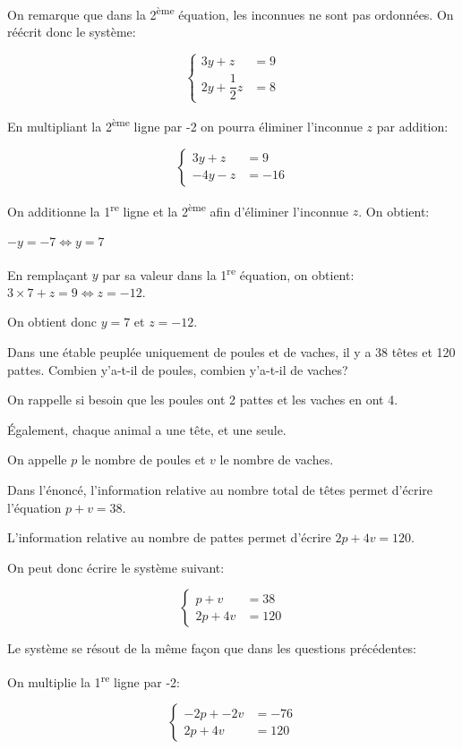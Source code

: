 \documentclass[a4paper,12pt]{scrartcl}
\begin{document}
On remarque que dans la 2\textsuperscript{ème} équation, les inconnues ne sont pas ordonnées. On réécrit donc le système:

$$
\begin{cases} 
3y+z &= 9 \\
2y + \dfrac{1}{2} z &= 8
\end{cases}
$$

En multipliant la 2\textsuperscript{ème} ligne par -2 on pourra éliminer l'inconnue $z$ par addition:
 
$$
\begin{cases} 
3y+z &= 9 \\
-4y - z &= -16
\end{cases}
$$

On additionne la 1\textsuperscript{re} ligne et la 2\textsuperscript{ème} afin d'éliminer l'inconnue $z$. On obtient:

$-y = -7 \Leftrightarrow y = 7$

En remplaçant $y$ par sa valeur dans la 1\textsuperscript{re} équation, on obtient: $3 \times 7 + z=9 \Leftrightarrow z = -12$. 

On obtient donc $y = 7$ et $z = -12$.

\question{}
Dans une étable peuplée uniquement de poules et de vaches, il y a 38 têtes et 120 pattes. Combien y'a-t-il de poules, combien y'a-t-il de vaches?

On rappelle si besoin que les poules ont 2 pattes et les vaches en ont 4. 

Également, chaque animal a une tête, et une seule.

On appelle $p$ le nombre de poules et $v$ le nombre de vaches. 

Dans l'énoncé, l'information relative au nombre total de têtes permet d'écrire l'équation $p+v = 38$.

L'information relative au nombre de pattes permet d'écrire $2p + 4v = 120$. 

On peut donc écrire le système suivant:

$$
\begin{cases} 
p+v &= 38 \\
2p + 4v &= 120
\end{cases}
$$

Le système se résout de la même façon que dans les questions précédentes:

On multiplie la 1\textsuperscript{re} ligne par -2:

$$
\begin{cases} 
-2p + -2v &= -76 \\
2p + 4v &= 120
\end{cases}
$$
\end{document}
